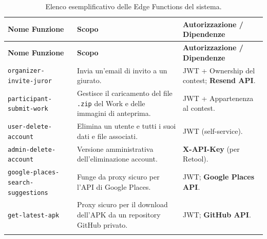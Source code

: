 \begin{longtable}{p{} p{} p{}}
\caption{Elenco esemplificativo delle Edge Functions del sistema.}
\toprule
\textbf{Nome Funzione} & \textbf{Scopo} & \textbf{Autorizzazione / Dipendenze} \\
\midrule
\endfirsthead
\toprule
\textbf{Nome Funzione} & \textbf{Scopo} & \textbf{Autorizzazione / Dipendenze} \\
\midrule
\endhead
\texttt{organizer-invite-juror} & Invia un'email di invito a un giurato.
& JWT + Ownership del contest; \textbf{Resend API}. \\
\texttt{participant-submit-work} & Gestisce il caricamento del file \texttt{.zip} del Work e delle immagini di anteprima.
& JWT + Appartenenza al contest. \\
\texttt{user-delete-account} & Elimina un utente e tutti i suoi dati e file associati.
& JWT (self-service). \\
\texttt{admin-delete-account} & Versione amministrativa dell'eliminazione account.
& \textbf{X-API-Key} (per Retool). \\
\texttt{google-places-search-suggestions} & Funge da proxy sicuro per l'API di Google Places.
& JWT; \textbf{Google Places API}. \\
\texttt{get-latest-apk} & Proxy sicuro per il download dell'APK da un repository GitHub privato.
& JWT; \textbf{GitHub API}. \\
\bottomrule
\label{tab:edge_functions}
\end{longtable}

